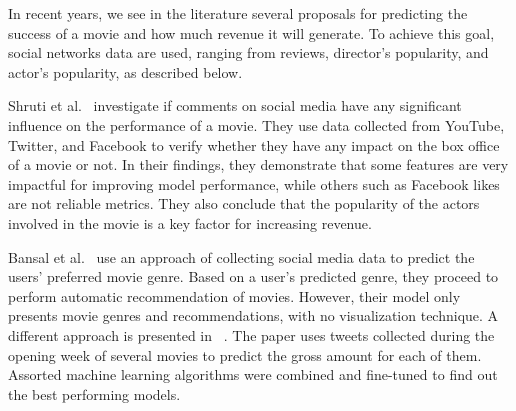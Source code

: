 In recent years, we see in the literature several proposals for predicting the success of a movie and how much revenue it will generate. To achieve this goal, social networks data are used, ranging from reviews, director's popularity, and actor’s popularity, as described below.

Shruti et al.~\cite{2014Influencesocialmedia} investigate if comments on social media have any significant influence on the performance of a movie. They use data collected from YouTube, Twitter, and Facebook to verify whether they have any impact on the box office of a movie or not. In their findings, they demonstrate that some features are very impactful for improving model performance, while others such as Facebook likes are not reliable metrics. They also conclude that the popularity of the actors involved in the movie is a key factor for increasing revenue.



Bansal et al.~\cite{2014Influencesocialmedia} use an approach of collecting social media data to predict the users' preferred movie genre. Based on a user's predicted genre, they proceed to perform automatic recommendation of movies. However, their model only presents movie genres and recommendations, with no visualization technique. A different approach is presented in ~\cite{2017PredictingMarketRevenue}. The paper uses tweets collected during the opening week of several movies to predict the gross amount for each of them. Assorted machine learning algorithms were combined and fine-tuned to find out the best performing models.


